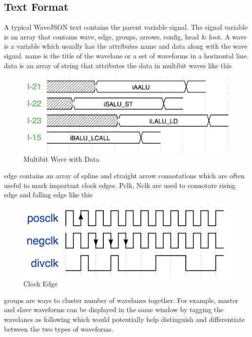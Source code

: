 \documentclass[14pt]{extarticle}
\begin{document}
\subsection{Text Format}
A typical WaveJSON text contains the parent variable signal. The signal variable is an array that contains wave, edge, groups, arrows, config, head \& foot. A wave is a variable which usually has the attributes name and data along with the wave signal. name is the title of the wavelane or a set of waveforms in a horizontal line. data is an array of string that attributes the data in multibit waves like this

\begin{figure}[H]
    \centering
    \includegraphics[scale=0.7]{wave}
    \caption{Multibit Wave with Data}
    \label{fig:my_label}
\end{figure}

edge  contains an array of spline and straight arrow connotations which are often useful to mark important clock edges. Pclk, Nclk are used to connotate rising edge and falling edge like this

\begin{figure}[H]
    \centering
    \includegraphics[scale=0.7]{clock}
    \caption{Clock Edge}
    \label{fig:my_label}
\end{figure}

groups are ways to cluster number of wavelanes together. For example, master and slave waveforms can be displayed in the same window by tagging the wavelanes as following which would potentially help distinguish and differentiate between the two types of waveforms.
\end{document}
